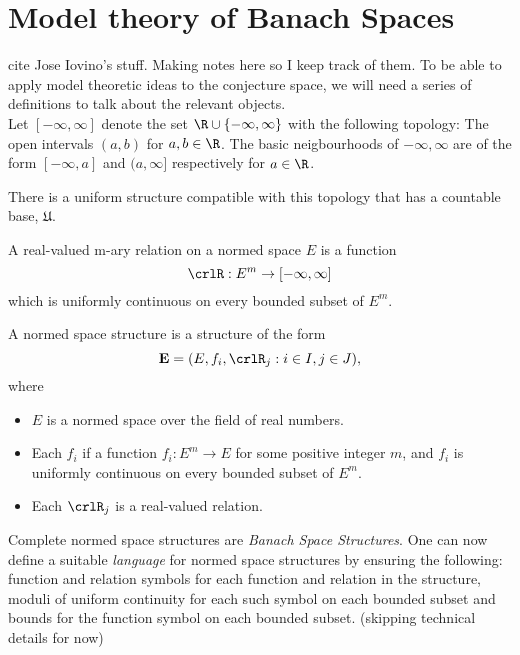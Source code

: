 \section{Model theory of Banach Spaces}
cite Jose Iovino's stuff. Making notes here so I keep track of them.
To be able to apply model theoretic ideas to the conjecture space, we will need a series of definitions to talk about the relevant objects.\\

Let $[-\infty, \infty]$ denote the set $\R\cup\{-\infty, \infty\}$ with the following topology: The open intervals $(a,b)$ for $a,b\in \R$. The basic neigbourhoods of $-\infty, \infty$ are of the form $[-\infty, a]$ and $(a,\infty]$ respectively for $a\in \R$.
\begin{remark}
    There is a uniform structure compatible with this topology that has a countable base, $\mathfrak{U}$.
\end{remark}

\begin{definition}
    A real-valued m-ary relation on a normed space $E$ is a function
    \begin{equation*}
        \crlR:E^m\rightarrow [-\infty, \infty]
    \end{equation*}
    which is uniformly continuous on every bounded subset of $E^m$.    
\end{definition}

\begin{definition}
    A normed space structure is a structure of the form
    \begin{equation*}
        \mathbf{E} = (E, f_i, \crlR_j : i\in I, j\in J),
    \end{equation*}
    where
    \begin{itemize}
        \item $E$ is a normed space over the field of real numbers.
        \item Each $f_i$ if a function $f_i : E^m\rightarrow E$ for some positive integer $m$, and $f_i$ is uniformly continuous on every bounded subset of $E^m$.
        \item Each $\crlR_j$ is a real-valued relation.
    \end{itemize}
\end{definition}

Complete normed space structures are \textit{Banach Space Structures}. One can now define a suitable \textit{language} for normed space structures by
ensuring the following: function and relation symbols for each function and relation in the structure, moduli of uniform continuity for each such symbol on each bounded subset
and bounds for the function symbol on each bounded subset. (skipping technical details for now)

